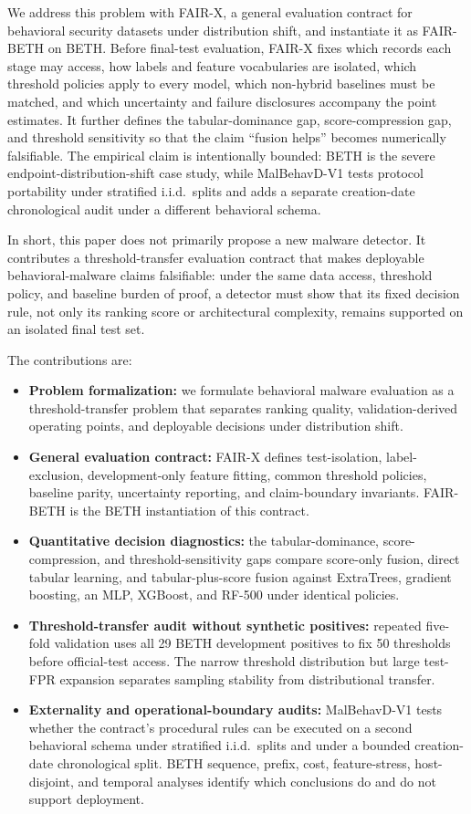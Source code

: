 \documentclass[10pt,journal,compsoc]{IEEEtran}
\begin{document}
We address this problem with FAIR-X, a general evaluation contract for behavioral security datasets under distribution shift, and instantiate it as FAIR-BETH on BETH. Before final-test evaluation, FAIR-X fixes which records each stage may access, how labels and feature vocabularies are isolated, which threshold policies apply to every model, which non-hybrid baselines must be matched, and which uncertainty and failure disclosures accompany the point estimates. It further defines the tabular-dominance gap, score-compression gap, and threshold sensitivity so that the claim ``fusion helps'' becomes numerically falsifiable. The empirical claim is intentionally bounded: BETH is the severe endpoint-distribution-shift case study, while MalBehavD-V1 tests protocol portability under stratified i.i.d.\ splits and adds a separate creation-date chronological audit under a different behavioral schema.

In short, this paper does not primarily propose a new malware detector. It contributes a threshold-transfer evaluation contract that makes deployable behavioral-malware claims falsifiable: under the same data access, threshold policy, and baseline burden of proof, a detector must show that its fixed decision rule, not only its ranking score or architectural complexity, remains supported on an isolated final test set.

The contributions are:
\begin{itemize}
    \item \textbf{Problem formalization:} we formulate behavioral malware evaluation as a threshold-transfer problem that separates ranking quality, validation-derived operating points, and deployable decisions under distribution shift.
    \item \textbf{General evaluation contract:} FAIR-X defines test-isolation, label-exclusion, development-only feature fitting, common threshold policies, baseline parity, uncertainty reporting, and claim-boundary invariants. FAIR-BETH is the BETH instantiation of this contract.
    \item \textbf{Quantitative decision diagnostics:} the tabular-dominance, score-compression, and threshold-sensitivity gaps compare score-only fusion, direct tabular learning, and tabular-plus-score fusion against ExtraTrees, gradient boosting, an MLP, XGBoost, and RF-500 under identical policies.
    \item \textbf{Threshold-transfer audit without synthetic positives:} repeated five-fold validation uses all 29 BETH development positives to fix 50 thresholds before official-test access. The narrow threshold distribution but large test-FPR expansion separates sampling stability from distributional transfer.
    \item \textbf{Externality and operational-boundary audits:} MalBehavD-V1 tests whether the contract's procedural rules can be executed on a second behavioral schema under stratified i.i.d.\ splits and under a bounded creation-date chronological split. BETH sequence, prefix, cost, feature-stress, host-disjoint, and temporal analyses identify which conclusions do and do not support deployment.
\end{itemize}
\end{document}
